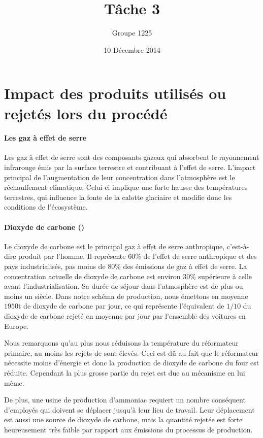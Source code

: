 \documentclass[a4paper, oneside, 12pt]{article}
\title{Tâche 3}
\author{Groupe 1225}
\date{10 Décembre 2014}
\begin{document}
\maketitle

\section{Impact des produits utilisés ou rejetés lors du procédé}

\paragraph{Les gaz à effet de serre} 

Les gaz à effet de serre sont des composants gazeux qui absorbent le rayonnement infrarouge
émis par la surface terrestre et contribuant à l’effet de serre. 
L’impact principal de l’augmentation de leur concentration 
dans l’atmosphère est le réchauffement climatique. 
Celui-ci implique une forte hausse des températures terrestres, 
qui influence la fonte de la calotte glaciaire 
et modifie donc les conditions de l’écosystème.

\paragraph{Dioxyde de carbone ()}

Le dioxyde de carbone est le principal gaz à effet de serre anthropique, 
c’est-à-dire produit par l’homme. 
Il représente $60\%$ de l’effet de serre anthropique et des pays industrialisés, 
pas moins de $80\%$ des émissions de gaz à effet de serre. 
La concentration actuelle de dioxyde de carbone 
est environ $30\%$ supérieure à celle avant l’industrialisation. 
Sa durée de séjour dans l’atmosphère est de plus ou moins un siècle. 
Dans notre schéma de production, nous émettons en moyenne $1950\si{\tonne}$ 
de dioxyde de carbone par jour, 
ce qui représente l’équivalent de $1/10$ du dioxyde de carbone rejeté 
en moyenne par jour par l’ensemble des voitures en Europe.

Nous remarquons qu’au plus nous réduisons la température du réformateur primaire, 
au moins les rejets de  sont élevés. 
Ceci est dû au fait que le réformateur nécessite moins d’énergie
et donc la production de dioxyde de carbone du four est réduite. 
Cependant la plus grosse partie du rejet est due au mécanisme en lui même. 

De plus, une usine de production d’ammoniac requiert un nombre conséquent d’employés 
qui doivent se déplacer jusqu’à leur lieu de travail. 
Leur déplacement est aussi une source de dioxyde de carbone, 
mais la quantité rejetée est forte heureusement très faible 
par rapport aux émissions du processus de production.
\end{document}
